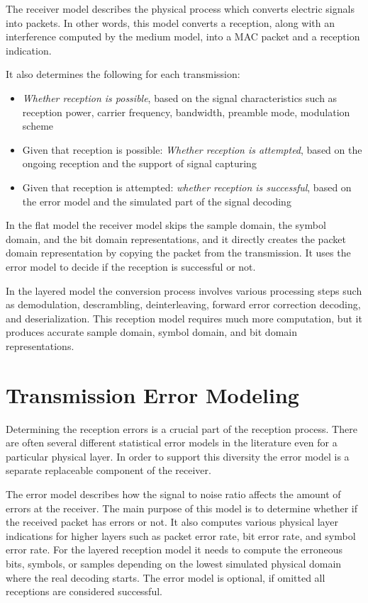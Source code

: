 The receiver model describes the physical process which converts electric
signals into packets. In other words, this model converts a reception, along
with an interference computed by the medium model, into a MAC packet and a
reception indication. 

It also determines the following for each transmission: 

\begin{itemize}
  \item \textit{Whether reception is possible}, based on the signal
    characteristics such as reception power, carrier frequency, 
    bandwidth, preamble mode, modulation scheme
  \item Given that reception is possible: \textit{Whether reception is attempted}, 
    based on the ongoing reception and the support of signal capturing
  \item Given that reception is attempted: \textit{whether reception is successful},
    based on the error model and the simulated part of the signal decoding
\end{itemize}

In the flat model the receiver model skips the sample domain, the symbol domain,
and the bit domain representations, and it directly creates the packet domain
representation by copying the packet from the transmission. It uses the error
model to decide if the reception is successful or not.

In the layered model the conversion process involves various processing steps
such as demodulation, descrambling, deinterleaving, forward error correction
decoding, and deserialization. This reception model requires much more
computation, but it produces accurate sample domain, symbol domain, and bit
domain representations.

\section{Transmission Error Modeling}

Determining the reception errors is a crucial part of the reception process.
There are often several different statistical error models in the literature
even for a particular physical layer. In order to support this diversity the
error model is a separate replaceable component of the receiver. 

The error model describes how the signal to noise ratio affects the amount of
errors at the receiver. The main purpose of this model is to determine whether
if the received packet has errors or not. It also computes various physical
layer indications for higher layers such as packet error rate, bit error rate,
and symbol error rate. For the layered reception model it needs to compute the
erroneous bits, symbols, or samples depending on the lowest simulated physical
domain where the real decoding starts. The error model is optional, if omitted
all receptions are considered successful.

